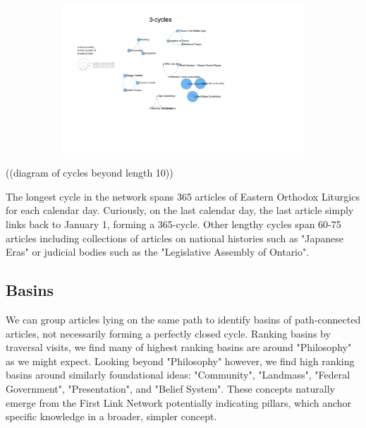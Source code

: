 \documentclass[twoside]{article}
\begin{document}
\begin{figure}[H]
\centering
\caption{highest ranking 3-Cycles}
    \begin{subfigure}[b]{0.8\textwidth}
        \includegraphics[width=\textwidth]{graphics/3_cycles.pdf}
    \end{subfigure}
\end{figure}
((diagram of cycles beyond length 10))

The longest cycle in the network spans 365 articles of Eastern Orthodox Liturgics for each calendar day. 
Curiously, on the last calendar day, the last article simply links back to January 1, forming a 365-cycle.
Other lengthy cycles span 60-75 articles including collections of articles on national histories such as "Japanese Eras" 
or judicial bodies such as the "Legislative Assembly of Ontario".


\subsection{Basins}
We can group articles lying on the same path to identify basins of path-connected articles, not necessarily forming a perfectly closed cycle.
Ranking basins by traversal visits, we find many of highest ranking basins are around "Philosophy" as we might expect. 
Looking beyond "Philosophy" however, we find high ranking basins around similarly foundational ideas:
"Community", "Landmass", "Federal Government", "Presentation", and "Belief System". 
These concepts naturally emerge from the First Link Network potentially indicating pillars, which 
anchor specific knowledge in a broader, simpler concept.
\end{document}

